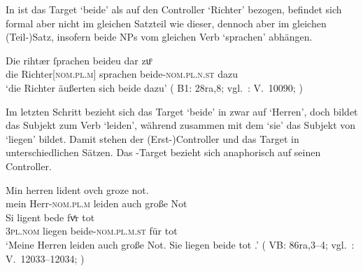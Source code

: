 
In  ist das Target  `beide' als
 auf den Controller  `Richter' bezogen, befindet sich
formal aber nicht im gleichen Satzteil wie dieser, dennoch aber im gleichen
(Teil-)Satz, insofern beide NPs vom gleichen Verb  `sprachen'
abhängen.

\begin{exe}
\ex \label{ex:beidedomains_3}
	\gll Die rihtær ſprachen beideu {dar zuͦ} \\
		die Richter[\textsc{nom.pl.m}] sprachen beide-\textsc{nom.pl.n.st}
			dazu \\
	\trans `die Richter äußerten sich beide dazu'
		(%
			B1: 28ra,8;
			vgl.~\KC: V.~10090; \cite[267]{schroeder1895}%
		)
\end{exe}

Im letzten Schritt bezieht sich das Target  `beide' in
 zwar auf  `Herren', doch bildet
 das Subjekt zum Verb  `leiden', während
 zusammen mit dem   `sie' das Subjekt
von  `liegen' bildet. Damit stehen der (Erst-)Controller
 und das Target  in unterschiedlichen Sätzen. Das
-Target bezieht sich anaphorisch auf seinen
Controller.

\begin{exe}
	\ex \label{ex:beidedomains_4}
		\gll Min herren lident ovch groze not. \\
			mein Herr-\textsc{nom.pl.m} leiden auch große Not \\
	\sn \gll Si ligent bede fvͤr tot \\
			\textsc{3pl\subM.nom} liegen beide-\textsc{nom.pl.m.st} für tot \\
	\trans `Meine Herren leiden auch große Not. Sie liegen beide tot
		.'
		(%
			VB: 86ra,3--4;
			vgl.~\KC: V.~12033--12034; \cite[301]{schroeder1895}%
		)		
\end{exe}

